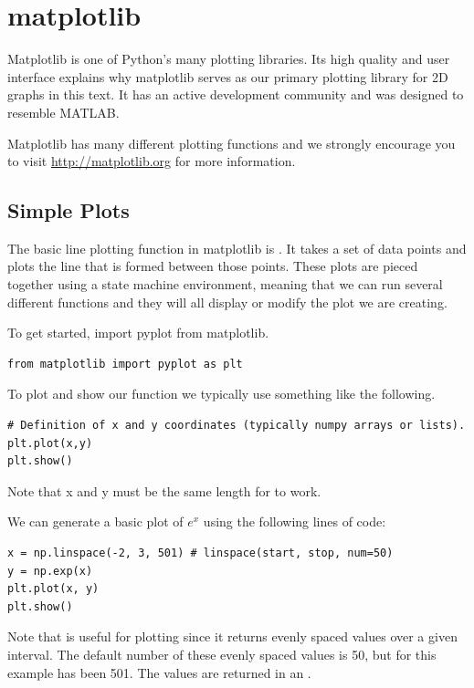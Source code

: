 \label{lab:Matplotlib_and_Mayavi}

\section*{matplotlib}
Matplotlib is one of Python's many plotting libraries. Its high quality
and user interface explains why matplotlib serves as our primary
plotting library for 2D graphs in this text. It has an active
development community and was designed to resemble MATLAB.

Matplotlib has many different plotting functions and we strongly
encourage you to visit \url{http://matplotlib.org} for more
information.

\subsection*{Simple Plots} 
The basic line plotting function in matplotlib is . It takes a
set of data points and plots the line that is formed between those points. 
These plots are pieced together using a state machine environment, meaning that 
we can run several different functions and they will all display or modify the 
plot we are creating. 

To get started, import pyplot from matplotlib.
\begin{lstlisting} 
from matplotlib import pyplot as plt
\end{lstlisting}

To plot and show our function we typically use something like the following.
\begin{lstlisting} 
# Definition of x and y coordinates (typically numpy arrays or lists).
plt.plot(x,y) 
plt.show() 
\end{lstlisting}

Note that x and y must be the same length for  to work. 

We can generate a basic plot of $e^x$ using the following lines of code:
\begin{lstlisting}
x = np.linspace(-2, 3, 501) # linspace(start, stop, num=50)  
y = np.exp(x)
plt.plot(x, y)
plt.show() 
\end{lstlisting}

Note that  is useful for plotting since it returns evenly spaced values over a given interval. The default number of these evenly spaced values is 50, but for this example has been 501. The values are returned in an . 

